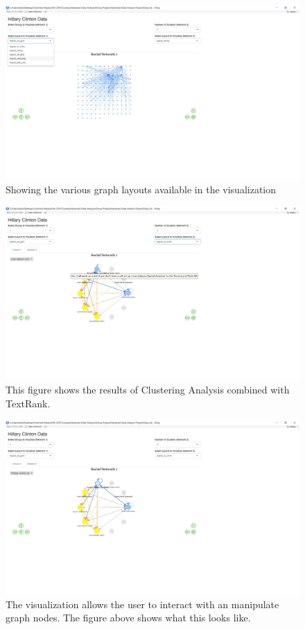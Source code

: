 \begin{figure}[h]
	\includegraphics[width=\textwidth]{eric/Viz_Screenshot_2}
	\caption{Showing the various graph layouts available in the visualization}
	\label{Viz2}
\end{figure}

\begin{figure}[h]
	\includegraphics[width=\textwidth]{eric/Viz_Screenshot_3}
	\caption{This figure shows the results of Clustering Analysis combined with TextRank.}
	\label{Viz3}
\end{figure}

\begin{figure}[h]
	\includegraphics[width=\textwidth]{eric/Viz_Screenshot_4}
	\caption{The visualization allows the user to interact with an manipulate graph nodes. The figure above shows what this looks like.}
	\label{Viz4}
\end{figure}
